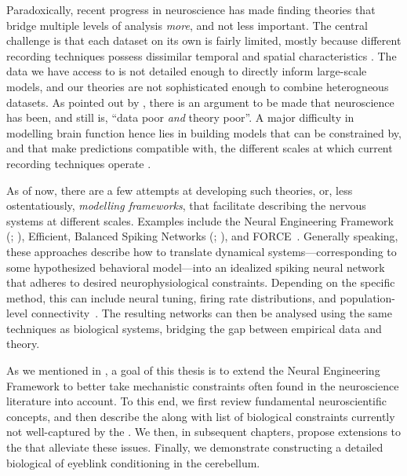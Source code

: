 Paradoxically, recent progress in neuroscience has made finding theories that bridge multiple levels of analysis \emph{more}, and not less important.
The central challenge is that each dataset on its own is fairly limited, mostly because different recording techniques possess dissimilar temporal and spatial characteristics \citep{sejnowski2014putting}.
The data we have access to is not detailed enough to directly inform large-scale models, and our theories are not sophisticated enough to combine heterogneous datasets. As pointed out by \citet{churchland1992computational}, there is an argument to be made that neuroscience has been, and still is, \enquote{data poor \emph{and} theory poor}.
A major difficulty in modelling brain function hence lies in building models that can be constrained by, and that make predictions compatible with, the different scales at which current recording techniques operate \citep[Chapter~9]{eliasmith2013how}.

As of now, there are a few attempts at developing such theories, or, less ostentatiously, \emph{modelling frameworks}, that facilitate describing the nervous systems at different scales.
Examples include the Neural Engineering Framework (\NEF; \cite{eliasmith2003neural}), Efficient, Balanced Spiking Networks (\EBN; \cite{boerlin2011spikebased,boerlin2013predictive}), and FORCE~\citep{sussillo2009generating,nicola2017supervised}.
Generally speaking, these approaches describe how to translate dynamical systems---corresponding to some hypothesized behavioral model---into an idealized spiking neural network that adheres to desired neurophysiological constraints.
Depending on the specific method, this can include neural tuning, firing rate distributions, and population-level connectivity~\citep{komer2016unified,nicola2017supervised}.
The resulting networks can then be analysed using the same techniques as biological systems, bridging the gap between empirical data and theory.

As we mentioned in , a goal of this thesis is to extend the Neural Engineering Framework to better take mechanistic constraints often found in the neuroscience literature into account.
To this end, we first review fundamental neuroscientific concepts, and then describe the \NEF along with list of biological constraints currently not well-captured by the \NEF.
We then, in subsequent chapters, propose extensions to the \NEF that alleviate these issues.
Finally, we demonstrate constructing a detailed biological of eyeblink conditioning in the cerebellum.
